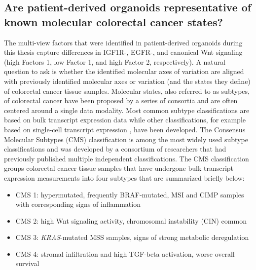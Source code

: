 \begin{flushleft}
\clearpage
\subsection{Are patient-derived organoids representative of known molecular colorectal cancer states?}

The multi-view factors that were identified in patient-derived organoids during this thesis capture differences in IGF1R-, EGFR-, and canonical Wnt signaling (high Factors 1, low Factor 1, and high Factor 2, respectively). A natural question to ask is whether the identified molecular axes of variation are aligned with previously identified molecular axes or variation (and the states they define) of colorectal cancer tissue samples. Molecular states, also referred to as subtypes, of colorectal cancer have been proposed by a series of consortia and are often centered around a single data modality. Most common subtype classifications are based on bulk transcript expression data \parencite{guinneyConsensusMolecularSubtypes2015} while other classifications, for example based on single-cell transcript expression \parencite{joanitoSinglecellBulkTranscriptome2022}, have been developed. The Consensus Molecular Subtypes (CMS) classification \parencite{guinneyConsensusMolecularSubtypes2015} is among the most widely used subtype classifications and was developed by a consortium of researchers that had previously published multiple independent classifications. The CMS classification groups colorectal cancer tissue samples that have undergone bulk transcript expression measurements into four subtypes that are summarized briefly below:

\begin{itemize} 
    \item CMS 1: hypermutated, frequently BRAF-mutated, MSI and CIMP samples with corresponding signs of inflammation
    \item CMS 2: high Wnt signaling activity, chromosomal instability (CIN) common
    \item CMS 3: \textit{KRAS}-mutated MSS samples, signs of strong metabolic deregulation
    \item CMS 4: stromal infiltration and high TGF-beta activation, worse overall survival
\end{itemize}


\end{flushleft}
